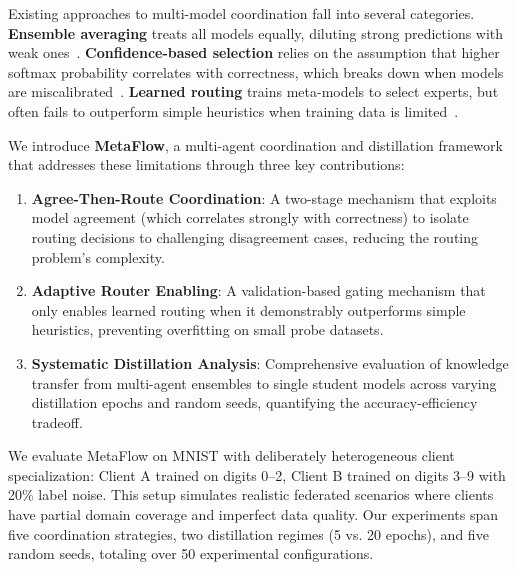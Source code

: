 \documentclass[12pt]{article}
\begin{document}
Existing approaches to multi-model coordination fall into several categories. \textbf{Ensemble averaging} treats all models equally, diluting strong predictions with weak ones~\cite{dietterich2000ensemble}. \textbf{Confidence-based selection} relies on the assumption that higher softmax probability correlates with correctness, which breaks down when models are miscalibrated~\cite{guo2017calibration}. \textbf{Learned routing} trains meta-models to select experts, but often fails to outperform simple heuristics when training data is limited~\cite{shazeer2017outrageously}.

We introduce \textbf{MetaFlow}, a multi-agent coordination and distillation framework that addresses these limitations through three key contributions:

\begin{enumerate}
    \item \textbf{Agree-Then-Route Coordination}: A two-stage mechanism that exploits model agreement (which correlates strongly with correctness) to isolate routing decisions to challenging disagreement cases, reducing the routing problem's complexity.
    
    \item \textbf{Adaptive Router Enabling}: A validation-based gating mechanism that only enables learned routing when it demonstrably outperforms simple heuristics, preventing overfitting on small probe datasets.
    
    \item \textbf{Systematic Distillation Analysis}: Comprehensive evaluation of knowledge transfer from multi-agent ensembles to single student models across varying distillation epochs and random seeds, quantifying the accuracy-efficiency tradeoff.
\end{enumerate}

We evaluate MetaFlow on MNIST with deliberately heterogeneous client specialization: Client A trained on digits 0--2, Client B trained on digits 3--9 with 20\% label noise. This setup simulates realistic federated scenarios where clients have partial domain coverage and imperfect data quality. Our experiments span five coordination strategies, two distillation regimes (5 vs. 20 epochs), and five random seeds, totaling over 50 experimental configurations.
\end{document}
